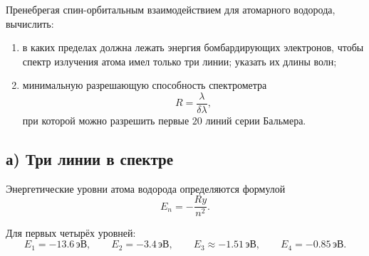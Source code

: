 \documentclass[../final.tex]{subfiles}
\begin{document}

\condition
Пренебрегая спин-орбитальным взаимодействием для атомарного водорода,
вычислить:

\begin{enumerate}
    \item[а)]
    в каких пределах должна лежать энергия бомбардирующих электронов,
    чтобы спектр излучения атома имел только три линии;
    указать их длины волн;

    \item[б)]
    минимальную разрешающую способность спектрометра
    \begin{equation*}
        R
        =
        \frac{\lambda}{\delta\lambda},
    \end{equation*}
    при которой можно разрешить первые $20$ линий серии Бальмера.
\end{enumerate}



\subsection*{а) Три линии в спектре}

Энергетические уровни атома водорода определяются формулой
%
\begin{equation*}
    E_n
    =
    -\frac{Ry}{n^2}.
\end{equation*}

Для первых четырёх уровней:
%
\begin{equation*}
    E_1=-13.6\,\text{эВ},
    \qquad
    E_2=-3.4\,\text{эВ},
    \qquad
    E_3\approx-1.51\,\text{эВ},
    \qquad
    E_4=-0.85\,\text{эВ}.
\end{equation*}


\end{document}
